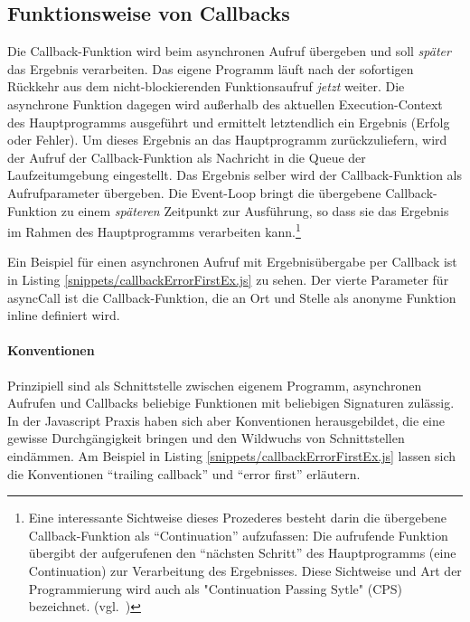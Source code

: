 \documentclass[
11pt, %
a4paper, %
oneside, %
pdfspacing, %
headinclude,
BCOR5mm, %
ngerman, %
bibtotocnumbered,
]{scrartcl}
\begin{document}
	
	\subsection{Funktionsweise von Callbacks}

	Die Callback-Funktion wird beim asynchronen Aufruf übergeben und soll \emph{später} das Ergebnis verarbeiten. 
	Das eigene Programm läuft nach der sofortigen Rückkehr aus dem nicht-blockierenden Funktionsaufruf \textit{jetzt} weiter. 	
	Die asynchrone Funktion dagegen wird außerhalb des aktuellen Execution-Context des Hauptprogramms ausgeführt und ermittelt letztendlich ein Ergebnis (Erfolg oder Fehler). Um dieses Ergebnis an das Hauptprogramm zurückzuliefern, wird der Aufruf der Callback-Funktion als Nachricht in die Queue der Laufzeitumgebung eingestellt. Das Ergebnis selber wird der Callback-Funktion als Aufrufparameter übergeben. Die Event-Loop bringt die übergebene Callback-Funktion zu einem \emph{späteren} Zeitpunkt zur Ausführung, so dass sie das Ergebnis im Rahmen des Hauptprogramms verarbeiten kann.\footnote{	
	Eine interessante Sichtweise dieses Prozederes besteht darin die übergebene Callback-Funktion als "`Continuation"' aufzufassen: Die aufrufende Funktion übergibt der aufgerufenen den "`nächsten Schritt"' des Hauptprogramms (eine Continuation) zur Verarbeitung des Ergebnisses. Diese Sichtweise und Art der Programmierung wird auch als "Continuation Passing Sytle" (CPS) bezeichnet. (vgl.~\citep{Rauschmayer.2012})}

	Ein Beispiel für einen asynchronen Aufruf mit Ergebnisübergabe per Callback ist in Listing \ref{snippets/callbackErrorFirstEx.js} zu sehen. Der vierte Parameter für \textsf{asyncCall} ist die Callback-Funktion, die an Ort und Stelle als anonyme Funktion inline definiert wird.
	
	
	\paragraph{Konventionen} 
	Prinzipiell sind als Schnittstelle zwischen eigenem Programm, asynchronen Aufrufen und Callbacks beliebige Funktionen mit beliebigen Signaturen zulässig. 
	In der Javascript Praxis haben sich aber Konventionen herausgebildet, die eine gewisse Durchgängigkeit bringen und den Wildwuchs von Schnittstellen eindämmen.
	Am Beispiel in Listing \ref{snippets/callbackErrorFirstEx.js} lassen sich die Konventionen "`trailing callback"' und "`error first"' erläutern.
\end{document}
